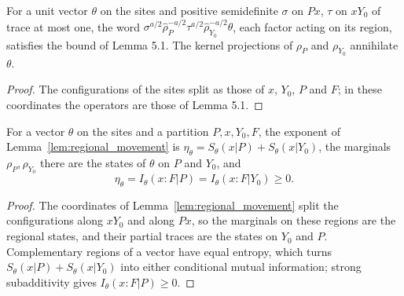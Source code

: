 \begin{lemma}
    \label{lem:regional_movement}
    \leanok
    For a unit vector $\theta$ on the sites and positive semidefinite $\sigma$ on $Px$, $\tau$
    on $xY_0$ of trace at most one, the word
    $\sigma^{a/2}\hat\rho_P^{-a/2}\tau^{a/2}\hat\rho_{Y_0}^{-a/2}\theta$, each factor acting
    on its region, satisfies the bound of Lemma 5.1. The kernel projections of $\rho_P$ and
    $\rho_{Y_0}$ annihilate $\theta$.
\end{lemma}

\begin{proof}\leanok
    The configurations of the sites split as those of $x$, $Y_0$, $P$ and $F$; in these
    coordinates the operators are those of Lemma 5.1.
\end{proof}

\begin{lemma}
    \label{lem:movement_eta_regional}
    \leanok
    For a vector $\theta$ on the sites and a partition $P,x,Y_0,F$, the exponent of
    Lemma~\ref{lem:regional_movement} is $\eta_\theta=S_\theta(x|P)+S_\theta(x|Y_0)$, the marginals
    $\rho_P,\rho_{Y_0}$ there are the states of $\theta$ on $P$ and $Y_0$, and
    \[
        \eta_\theta=I_\theta(x:F|P)=I_\theta(x:F|Y_0)\ge0.
    \]
\end{lemma}

\begin{proof}\leanok
    The coordinates of Lemma~\ref{lem:regional_movement} split the configurations along $xY_0$
    and along $Px$, so the marginals on these regions are the regional states, and their
    partial traces are the states on $Y_0$ and $P$. Complementary regions of a vector have
    equal entropy, which turns $S_\theta(x|P)+S_\theta(x|Y_0)$ into either conditional mutual
    information; strong subadditivity gives $I_\theta(x:F|P)\ge0$.
\end{proof}


